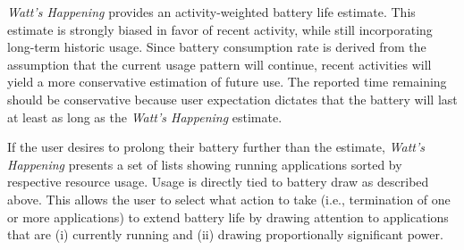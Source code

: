 \emph{Watt's Happening} provides an activity-weighted battery life estimate.
This estimate is strongly biased in favor of recent activity, while still incorporating long-term historic usage. 
Since battery consumption rate is derived from the assumption that the current usage pattern will continue, recent activities will yield a more conservative estimation of future use.
The reported time remaining should be conservative because user expectation dictates that the battery will last at least as long as the \emph{Watt's Happening} estimate.

If the user desires to prolong their battery further than the estimate, \emph{Watt's Happening} presents a set of lists showing running applications sorted by respective resource usage.
Usage is directly tied to battery draw as described above. 
This allows the user to select what action to take (i.e., termination of one or more applications) to extend battery life by drawing attention to applications that are (i) currently running and (ii) drawing proportionally significant power.





